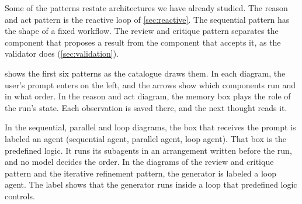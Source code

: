 Some of the patterns restate architectures we have already studied. The reason and act pattern is
the reactive loop of \cref{sec:reactive}. The sequential pattern has the shape of a fixed workflow.
The review and critique pattern separates the component that proposes a result from the component
that accepts it, as the validator does (\cref{sec:validation}).

 shows the first six patterns as the catalogue draws them.
In each diagram, the user's prompt enters on the left, and the arrows show which components run and
in what order. In the reason and act diagram, the memory box plays the role of the run's state.
Each observation is saved there, and the next thought reads it.

In the sequential, parallel and loop diagrams, the box that receives the prompt is labeled an agent
(sequential agent, parallel agent, loop agent). That box is the predefined logic. It runs its
subagents in an arrangement written before the run, and no model decides the order. In the
diagrams of the review and critique pattern and the iterative refinement pattern, the generator is
labeled a loop agent. The label shows that the generator runs inside a loop that predefined logic
controls.

